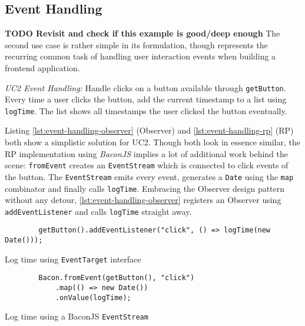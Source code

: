 \documentclass[12pt,a4paper]{article}
\begin{document}
\subsection{Event Handling}

\textbf{TODO Revisit and check if this example is good/deep enough} The second use case is rather simple in its formulation, though represents the recurring common task of handling user interaction events when building a frontend application.

\begin{framed}
	\noindent\emph{UC2 Event Handling:} Handle clicks on a button available through \texttt{getButton}. Every time a user clicks the button, add the current timestamp to a list using \texttt{logTime}. The list shows all timestamps the user clicked the button eventually.
\end{framed}

Listing \ref{lst:event-handling-observer} (Observer) and \ref{lst:event-handling-rp} (RP) both show a simplistic solution for UC2. Though both look in essence similar, the RP implementation using \emph{BaconJS} implies a lot of additional work behind the scene: \texttt{fromEvent} creates an \texttt{EventStream} which is connected to click events of the button. The \texttt{EventStream} emits every event, generates a \texttt{Date} using the \texttt{map} combinator and finally calls \texttt{logTime}. Embracing the Observer design pattern without any detour, \ref{lst:event-handling-observer} registers an Observer using \texttt{addEventListener} and calls \texttt{logTime} straight away.

\begin{listing}[H]
	\begin{verbatim}
		getButton().addEventListener("click", () => logTime(new Date()));
	\end{verbatim}
	\caption{Log time using \texttt{EventTarget} interface}
	\label{lst:event-handling-observer}
\end{listing}

\begin{listing}[H]
	\begin{verbatim}
		Bacon.fromEvent(getButton(), "click")
			.map(() => new Date())
			.onValue(logTime);
	\end{verbatim}
	\caption{Log time using a BaconJS \texttt{EventStream}}
	\label{lst:event-handling-rp}
\end{listing}
\end{document}
